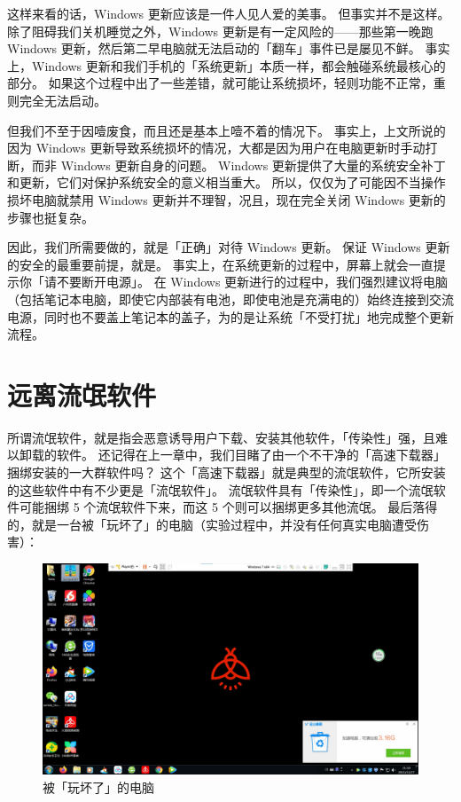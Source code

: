 这样来看的话，Windows 更新应该是一件人见人爱的美事。
但事实并不是这样。
除了阻碍我们关机睡觉之外，Windows 更新是有一定风险的——那些第一晚跑 Windows 更新，然后第二早电脑就无法启动的「翻车」事件已是屡见不鲜。
事实上，Windows 更新和我们手机的「系统更新」本质一样，都会触碰系统最核心的部分。
如果这个过程中出了一些差错，就可能让系统损坏，轻则功能不正常，重则完全无法启动。

但我们不至于因噎废食，而且还是基本上噎不着的情况下。
事实上，上文所说的因为 Windows 更新导致系统损坏的情况，大都是因为用户在电脑更新时手动打断，而非 Windows 更新自身的问题。
Windows 更新提供了大量的系统安全补丁和更新，它们对保护系统安全的意义相当重大。
所以，仅仅为了可能因不当操作损坏电脑就禁用 Windows 更新并不理智，况且，现在完全关闭 Windows 更新的步骤也挺复杂。

因此，我们所需要做的，就是「正确」对待 Windows 更新。
保证 Windows 更新的安全的最重要前提，就是。
事实上，在系统更新的过程中，屏幕上就会一直提示你「请不要断开电源」。
在 Windows 更新进行的过程中，我们强烈建议将电脑（包括笔记本电脑，即使它内部装有电池，即使电池是充满电的）始终连接到交流电源，同时也不要盖上笔记本的盖子，为的是让系统「不受打扰」地完成整个更新流程。

\section{远离流氓软件}

所谓流氓软件，就是指会恶意诱导用户下载、安装其他软件，「传染性」强，且难以卸载的软件。
还记得在上一章中，我们目睹了由一个不干净的「高速下载器」捆绑安装的一大群软件吗？
这个「高速下载器」就是典型的流氓软件，它所安装的这些软件中有不少更是「流氓软件」。
流氓软件具有「传染性」，即一个流氓软件可能捆绑 5 个流氓软件下来，而这 5 个则可以捆绑更多其他流氓。
最后落得的，就是一台被「玩坏了」的电脑（实验过程中，并没有任何真实电脑遭受伤害）：

\begin{figure}[htb!]
  \centering
  \includegraphics[width=12cm]{assets/Computer_In_A_Mess.jpg}
  \caption{被「玩坏了」的电脑}
  \label{Computer_In_A_Mess}
\end{figure}

